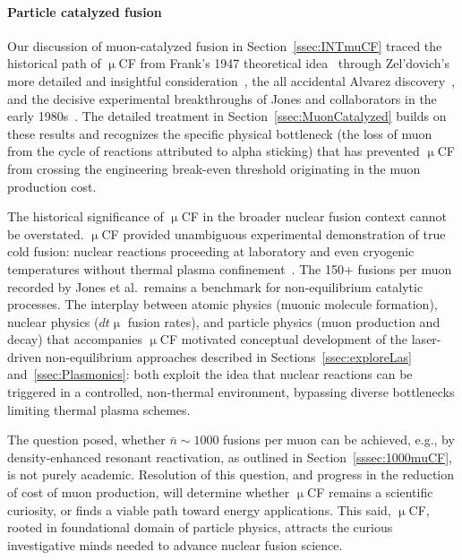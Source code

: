 \documentclass[particles,article,accept,pdftex,moreauthors]{Definitions/mdpi}
\begin{document}
\paragraph*{\bf Particle catalyzed fusion}
Our discussion of muon-catalyzed fusion in Section~\ref{ssec:INTmuCF} traced the historical path of $\upmu$CF from Frank's 1947 theoretical idea~\cite{Frank:1947} through Zel'dovich's more detailed and insightful consideration~\cite{Zel:1954}, the all accidental Alvarez discovery~\cite{Alvarez:1957un}, and the decisive experimental breakthroughs of Jones and collaborators in the early 1980s~\cite{Jones:1983pw,Jones:1986kk,Jones:1986Na}. The detailed treatment in Section~\ref{ssec:MuonCatalyzed} builds on these results and recognizes the specific physical bottleneck (the loss of muon from the cycle of reactions attributed to alpha sticking) that has prevented $\upmu$CF from crossing the engineering break-even threshold originating in the muon production cost.

The historical significance of $\upmu$CF in the broader nuclear fusion context cannot be overstated. $\upmu$CF provided unambiguous experimental demonstration of true cold fusion: nuclear reactions proceeding at laboratory and even cryogenic temperatures without thermal plasma confinement~\cite{Rafelski:1987Jones}. The 150+ fusions per muon recorded by Jones et al.\ remains a benchmark for non-equilibrium catalytic processes. The interplay between atomic physics (muonic molecule formation), nuclear physics ($dt\upmu$ fusion rates), and particle physics (muon production and decay) that accompanies $\upmu$CF motivated conceptual development of the laser-driven non-equilibrium approaches described in Sections~\ref{ssec:exploreLas} and~\ref{ssec:Plasmonics}: both exploit the idea that nuclear reactions can be triggered in a controlled, non-thermal environment, bypassing diverse bottlenecks limiting thermal plasma schemes.

The question posed, whether $\bar{n}\sim 1000$ fusions per muon can be achieved, e.g., by density-enhanced resonant reactivation, as outlined in Section~\ref{sssec:1000muCF}, is not purely academic. Resolution of this question, and progress in the reduction of cost of muon production, will determine whether $\upmu$CF remains a scientific curiosity, or finds a viable path toward energy applications. This said, $\upmu$CF, rooted in foundational domain of particle physics, attracts the curious investigative minds needed to advance nuclear fusion science.
\end{document}
